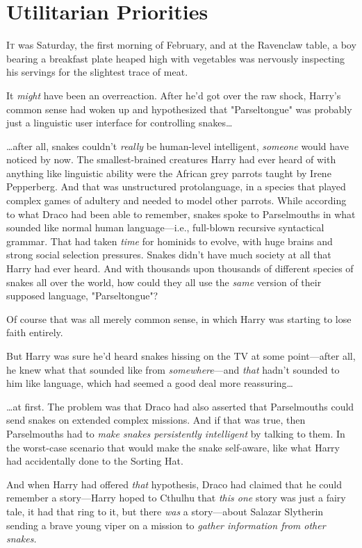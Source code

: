 \chapter{Utilitarian Priorities}

\lettrine{I}{t} was Saturday,
the first morning of February, and at the Ravenclaw table, a boy bearing a
breakfast plate heaped high with vegetables was nervously inspecting his
servings for the slightest trace of meat.

It \emph{might} have been an overreaction. After he'd got over the raw
shock, Harry's common sense had woken up and hypothesized that "Parseltongue"
was probably just a linguistic user interface for controlling snakes…

…after all, snakes couldn't \emph{really} be human-level intelligent,
\emph{someone} would have noticed by now. The smallest-brained creatures Harry
had ever heard of with anything like linguistic ability were the African grey
parrots taught by Irene Pepperberg. And that was unstructured protolanguage, in
a species that played complex games of adultery and needed to model other
parrots. While according to what Draco had been able to remember, snakes spoke
to Parselmouths in what sounded like normal human language---i.e., full-blown
recursive syntactical grammar. That had taken \emph{time} for hominids to
evolve, with huge brains and strong social selection pressures. Snakes didn't
have much society at all that Harry had ever heard. And with thousands upon
thousands of different species of snakes all over the world, how could they all
use the \emph{same} version of their supposed language, "Parseltongue"?

Of course that was all merely common sense, in which Harry was starting to lose
faith entirely.

But Harry was sure he'd heard snakes hissing on the TV at some point---after
all, he knew what that sounded like from \emph{somewhere}---and \emph{that}
hadn't sounded to him like language, which had seemed a good deal more
reassuring…

…at first. The problem was that Draco had also asserted that
Parselmouths could send snakes on extended complex missions. And if that was
true, then Parselmouths had to \emph{make snakes persistently intelligent} by
talking to them. In the worst-case scenario that would make the snake
self-aware, like what Harry had accidentally done to the Sorting Hat.

And when Harry had offered \emph{that} hypothesis, Draco had claimed that he
could remember a story---Harry hoped to Cthulhu that \emph{this one} story was
just a fairy tale, it had that ring to it, but there \emph{was} a story---about
Salazar Slytherin sending a brave young viper on a mission to \emph{gather
information from other snakes.}

